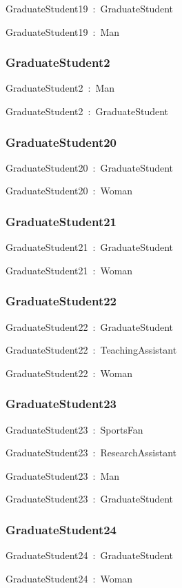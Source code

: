 \documentclass{article}
\begin{document}
GraduateStudent19~:~GraduateStudent

GraduateStudent19~:~Man

\subsubsection*{GraduateStudent2}

GraduateStudent2~:~Man

GraduateStudent2~:~GraduateStudent

\subsubsection*{GraduateStudent20}

GraduateStudent20~:~GraduateStudent

GraduateStudent20~:~Woman

\subsubsection*{GraduateStudent21}

GraduateStudent21~:~GraduateStudent

GraduateStudent21~:~Woman

\subsubsection*{GraduateStudent22}

GraduateStudent22~:~GraduateStudent

GraduateStudent22~:~TeachingAssistant

GraduateStudent22~:~Woman

\subsubsection*{GraduateStudent23}

GraduateStudent23~:~SportsFan

GraduateStudent23~:~ResearchAssistant

GraduateStudent23~:~Man

GraduateStudent23~:~GraduateStudent

\subsubsection*{GraduateStudent24}

GraduateStudent24~:~GraduateStudent

GraduateStudent24~:~Woman
\end{document}
